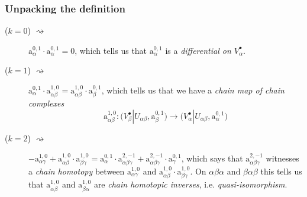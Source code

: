 \documentclass{beamer}
\begin{document}
            \begin{frame}\frametitle{Unpacking the definition}
                \begin{description}
                    \item[($k=0$) $\rightsquigarrow$] $\mathrm{a}_{\alpha}^{0,1}\cdot\mathrm{a}_{\alpha}^{0,1}=0$, which tells us that $\mathrm{a}_{\alpha}^{0,1}$ is a \emph{differential on $V_\alpha^\bullet$}.
                    \pause
                    \item[($k=1$) $\rightsquigarrow$] $\mathrm{a}_{\alpha}^{0,1}\cdot\mathrm{a}_{\alpha\beta}^{1,0} = \mathrm{a}_{\alpha\beta}^{1,0}\cdot\mathrm{a}_{\beta}^{0,1}$, which tells us that we have a \emph{chain map of chain complexes}
                        \begin{equation*}
                            \mathrm{a}_{\alpha\beta}^{1,0} \colon \big(V_\beta^\bullet|U_{\alpha\beta},\mathrm{a}_\beta^{0,1}\big) \to \big(V_\alpha^\bullet|U_{\alpha\beta},\mathrm{a}_\alpha^{0,1}\big)
                        \end{equation*}
                    \vspace{-1.5em}
                    \pause
                    \item[($k=2$) $\rightsquigarrow$] $-\mathrm{a}_{\alpha\gamma}^{1,0} + \mathrm{a}_{\alpha\beta}^{1,0}\cdot\mathrm{a}_{\beta\gamma}^{1,0} = \mathrm{a}_{\alpha}^{0,1}\cdot\mathrm{a}_{\alpha\beta\gamma}^{2,-1} + \mathrm{a}_{\alpha\beta\gamma}^{2,-1}\cdot\mathrm{a}_{\gamma}^{0,1}$, which says that $\mathrm{a}_{\alpha\beta\gamma}^{2,-1}$ witnesses a \emph{chain homotopy} between $\mathrm{a}_{\alpha\gamma}^{1,0}$ and $\mathrm{a}_{\alpha\beta}^{1,0}\cdot\mathrm{a}_{\beta\gamma}^{1,0}$.
                        On $\alpha\beta\alpha$ and $\beta\alpha\beta$ this tells us that $\mathrm{a}_{\alpha\beta}^{1,0}$ and $\mathrm{a}_{\beta\alpha}^{1,0}$ are \emph{chain homotopic inverses}, i.e. \emph{quasi-isomorphism}.
                \end{description}
            \end{frame}
\end{document}

